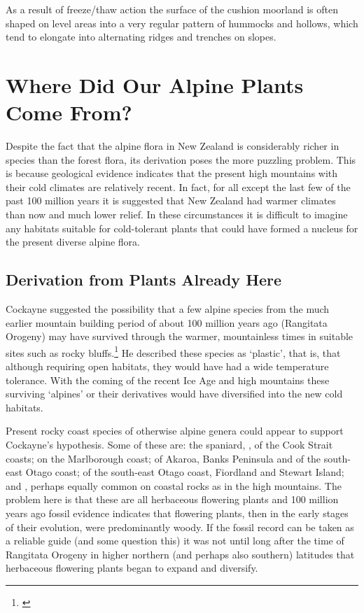As a result of freeze/thaw action the surface of the cushion moorland is often shaped on level areas into a very regular pattern of hummocks and hollows, which tend to elongate into alternating ridges and trenches on slopes.

\chapter{Where Did Our Alpine Plants Come From?}

Despite the fact that the alpine flora in New Zealand is considerably richer in species than the forest flora, its derivation poses the more puzzling problem.
This is because geological evidence indicates that the present high mountains with their cold climates are relatively recent.
In fact, for all except the last few of the past 100 million years it is suggested that New Zealand had warmer climates than now and much lower relief.
In these circumstances it is difficult to imagine any habitats suitable for cold-tolerant plants that could have formed a nucleus for the present diverse alpine flora.

\section{Derivation from Plants Already Here}

Cockayne suggested the possibility that a few alpine species from the much earlier mountain building period of about 100 million years ago (Rangitata Orogeny) may have survived through the warmer, mountainless times in suitable sites such as rocky bluffs.\footnote{\cite{cockayne1928vegetation}}
He described these species as `plastic', that is, that although requiring open habitats, they would have had a wide temperature tolerance.
With the coming of the recent Ice Age and high mountains these surviving `alpines' or their derivatives would have diversified into the new cold habitats.

Present rocky coast species of otherwise alpine genera could appear to support Cockayne's hypothesis.
Some of these are: the spaniard, , of the Cook Strait coasts;  on the Marlborough coast;  of Akaroa, Banks Peninsula and  of the south-east Otago coast;  of the south-east Otago coast, Fiordland and Stewart Island; and , perhaps equally common on coastal rocks as in the high mountains.
The problem here is that these are all herbaceous flowering plants and 100 million years ago fossil evidence indicates that flowering plants, then in the early stages of their evolution, were predominantly woody.
If the fossil record can be taken as a reliable guide (and some question this) it was not until long after the time of Rangitata Orogeny in higher northern (and perhaps also southern) latitudes that herbaceous flowering plants began to expand and diversify.

